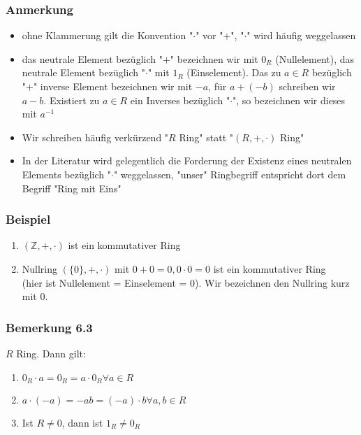 \documentclass[a4paper]{scrartcl}
\DeclareMathOperator{\Forall}{\forall}
\theoremstyle{definition}
\theoremstyle{plain}
\theoremstyle{plain}
\theoremstyle{remark}
\theoremstyle{remark}
\theoremstyle{remark}
\theoremstyle{remark}
\theoremstyle{remark}
\begin{document}
\subsubsection{Anmerkung}
\label{sec-3-2-1}
\begin{itemize}
\item ohne Klammerung gilt die Konvention "$\cdot$" vor "$+$", "$\cdot$" wird häufig weggelassen
\item das neutrale Element bezüglich "$+$" bezeichnen wir mit $0_R$ (Nullelement), das neutrale Element bezüglich "$\cdot$" mit $1_R$ (Einselement).
Das zu $a\in R$ bezüglich "$+$" inverse Element bezeichnen wir mit $-a$,
für $a + (-b)$ schreiben wir $a - b$. Existiert zu $a\in R$ ein Inverses bezüglich "$\cdot$", so bezeichnen wir dieses mit $a^{-1}$
\item Wir schreiben häufig verkürzend "$R$ Ring" statt "$(R,+,\cdot)$ Ring"
\item In der Literatur wird gelegentlich die Forderung der Existenz eines neutralen Elements bezüglich "$\cdot$" weggelassen, "unser" Ringbegriff
entspricht dort dem Begriff "Ring mit Eins"
\end{itemize}
\subsubsection{Beispiel}
\label{sec-3-2-2}
\begin{enumerate}
\item $(\mathbb{Z},+,\cdot)$ ist ein kommutativer Ring
\item Nullring $(\{0\},+,\cdot)$ mit $0 + 0 = 0, 0\cdot 0 = 0$ ist ein kommutativer Ring \\
           (hier ist Nullelement = Einselement = 0). Wir bezeichnen den Nullring kurz mit $0$.
\end{enumerate}
\subsubsection{Bemerkung 6.3}
\label{sec-3-2-3}
$R$ Ring. Dann gilt:
\begin{enumerate}
\item $0_R\cdot a = 0_R = a\cdot 0_R\Forall a\in R$
\item $a\cdot (-a) = - a b = (-a) \cdot b \Forall a,b\in R$
\item Ist $R\neq 0$, dann ist $1_R\neq 0_R$
\end{enumerate}
\end{document}
